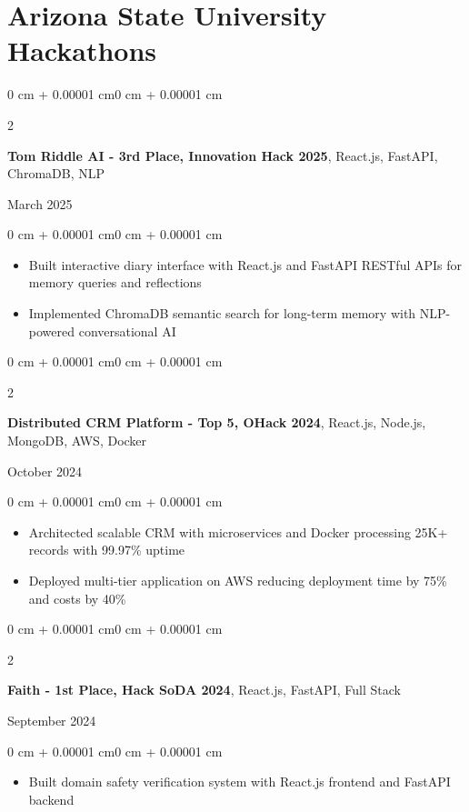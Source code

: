 \documentclass[10pt]{article}
\newenvironment{highlights}{
    \begin{itemize}[
        topsep=0.10 cm,
        parsep=0.10 cm,
        partopsep=0pt,
        itemsep=0pt,
        leftmargin=0 cm + 10pt
    ]
}{
    \end{itemize}
}
\newenvironment{onecolentry}{
    \begin{adjustwidth}{0 cm + 0.00001 cm}{0 cm + 0.00001 cm}
}{
    \end{adjustwidth}
}
\newenvironment{twocolentry}[2][]{
    \onecolentry
    \def\secondColumn{#2}
    \setcolumnwidth{\fill, 4.5 cm}
    \begin{paracol}{2}
}{
    \switchcolumn \raggedleft \secondColumn
    \end{paracol}
    \endonecolentry
}
\begin{document}
    \section{Arizona State University Hackathons}

    \begin{twocolentry}{March 2025}
        \textbf{Tom Riddle AI - 3rd Place, Innovation Hack 2025}, React.js, FastAPI, ChromaDB, NLP
    \end{twocolentry}
    
    \begin{onecolentry}
        \begin{highlights}
            \item Built interactive diary interface with React.js and FastAPI RESTful APIs for memory queries and reflections
            \item Implemented ChromaDB semantic search for long-term memory with NLP-powered conversational AI
        \end{highlights}
    \end{onecolentry}
    
    \vspace{0.15cm}
    \begin{twocolentry}{October 2024}
        \textbf{Distributed CRM Platform - Top 5, OHack 2024}, React.js, Node.js, MongoDB, AWS, Docker
    \end{twocolentry}
    
    \begin{onecolentry}
        \begin{highlights}
            \item Architected scalable CRM with microservices and Docker processing 25K+ records with 99.97\% uptime
            \item Deployed multi-tier application on AWS reducing deployment time by 75\% and costs by 40\%
        \end{highlights}
    \end{onecolentry}

    
    \vspace{0.15cm}

    \begin{twocolentry}{September 2024}
        \textbf{Faith - 1st Place, Hack SoDA 2024}, React.js, FastAPI, Full Stack
    \end{twocolentry}
    
    \begin{onecolentry}
        \begin{highlights}
            \item Built domain safety verification system with React.js frontend and FastAPI backend
        \end{highlights}
    \end{onecolentry}
    
\end{document}
